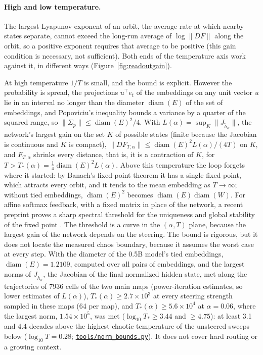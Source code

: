 \documentclass[11pt,letterpaper]{article}
\newcommand{\repourl}{https://github.com/tdj28/neural-shrimp}
\newcommand{\reporef}{arxiv-v1}
\newcommand{\repo}[1]{\href{\repourl/blob/\reporef/#1}{\nolinkurl{#1}}}
\begin{document}

\paragraph{High and low temperature.} The largest Lyapunov exponent of an orbit, the average rate at which nearby
states separate, cannot exceed the long-run average of $\log\|DF\|$ along the orbit, so a positive exponent requires
that average to be positive (this gain condition is necessary, not sufficient). Both ends of the temperature axis work
against it, in different ways (Figure~\ref{fig:readoutgain}).

At high temperature $1/T$ is small, and the bound is explicit. However the probability is spread, the projections
$u^{\top}e_t$ of the embeddings on any unit vector $u$ lie in an interval no longer than the diameter
$\operatorname{diam}(E)$ of the set of embeddings, and Popoviciu's inequality bounds a variance by a quarter of the
squared range, so $\|\Sigma_p\|\le\operatorname{diam}(E)^2/4$. With $L(\alpha)=\sup_K\|J_{\tilde h_\alpha}\|$, the
network's largest gain on the set $K$ of possible states (finite because the Jacobian is continuous and $K$ is
compact), $\|DF_{T,\alpha}\|\le\operatorname{diam}(E)^2L(\alpha)/(4T)$ on $K$, and $F_{T,\alpha}$ shrinks every
distance, that is, it is a contraction of $K$, for $T>T_*(\alpha)=\tfrac14\operatorname{diam}(E)^2L(\alpha)$. Above
this temperature the loop forgets where it started: by Banach's fixed-point theorem it has a single fixed point, which attracts
every orbit, and it tends to the
mean embedding as $T\to\infty$; without tied embeddings, $\operatorname{diam}(E)^2$ becomes
$\operatorname{diam}(E)\operatorname{diam}(W)$. For affine softmax feedback, with a fixed matrix in place of the network, a recent preprint proves a sharp spectral
threshold for the uniqueness and global stability of the fixed point \cite{wang2026logitfixed}. The threshold is a curve in the
$(\alpha,T)$ plane, because the largest
gain of the network depends on the steering. The bound is rigorous, but it does not locate the measured chaos boundary, because it assumes the worst
case at every step. With the diameter of the 0.5B model's tied embeddings, $\operatorname{diam}(E)=1.2109$, computed
over all pairs of embeddings, and the largest norms of
$J_{\tilde h_\alpha}$, the Jacobian of the final normalized hidden state, met along the trajectories of 7936 cells of
the two main maps (power-iteration estimates, so lower estimates of $L(\alpha)$), $T_*(\alpha)\ge2.7\times10^{3}$ at every
steering strength sampled in these maps (64 per map), and $T_*(\alpha)\ge5.6\times10^{4}$ at $\alpha=0.06$, where the
largest norm, $1.54\times10^{5}$, was met ($\log_{10}T_*\ge3.44$ and $\ge4.75$): at least 3.1 and 4.4 decades
above the highest chaotic temperature of the unsteered sweeps below ($\log_{10}T=0.28$; \repo{tools/norm_bounds.py}).
It does not cover hard routing or a growing context.
\end{document}
